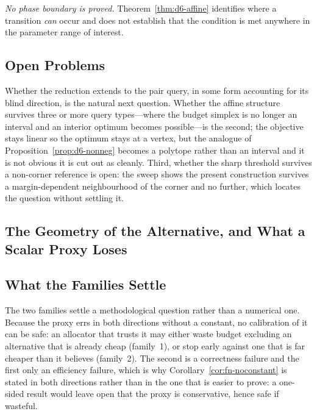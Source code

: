 \documentclass[conference]{IEEEtran}
\theoremstyle{definition}
\begin{document}
\emph{No phase boundary is proved.} Theorem~\ref{thm:d6-affine} identifies where a transition
\emph{can} occur and does not establish that the condition is met anywhere in the parameter
range of interest.

\subsection{Open Problems}

Whether the reduction extends to the pair query, in some form accounting for its blind
direction, is the natural next question. Whether the affine structure survives three or more
query types---where the budget simplex is no longer an interval and an interior optimum
becomes possible---is the second; the objective stays linear so the optimum stays at a
vertex, but the analogue of Proposition~\ref{prop:d6-nonneg} becomes a polytope rather than an
interval and it is not obvious it is cut out as cleanly. Third, whether the sharp threshold
survives a non-corner reference is open: the sweep shows the present construction survives a
margin-dependent neighbourhood of the corner and no further, which locates the question
without settling it.


\subsection{The Geometry of the Alternative, and What a Scalar Proxy Loses}
\label{sec:fn-discussion}

\subsection{What the Families Settle}

The two families settle a methodological question rather than a numerical one. Because the
proxy errs in both directions without a constant, no calibration of it can be safe: an
allocator that trusts it may either waste budget excluding an alternative that is already
cheap (family~1), or stop early against one that is far cheaper than it believes (family~2).
The second is a correctness failure and the first only an efficiency failure, which is why
Corollary~\ref{cor:fn-noconstant} is stated in both directions rather than in the one that is
easier to prove: a one-sided result would leave open that the proxy is conservative, hence
safe if wasteful.
\end{document}
